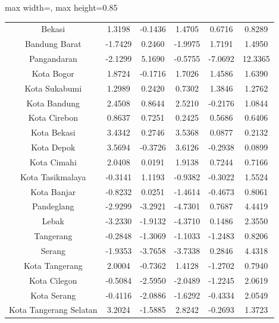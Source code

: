 \begin{table}[H]
\begin{adjustbox}{max width=\textwidth, max height=0.85\textheight}
\begin{tabular}{|c|c|c|c|c|c|}
Bekasi & 1.3198 & -0.1436 & 1.4705 & 0.6716 & 0.8289 \\
Bandung Barat & -1.7429 & 0.2460 & -1.9975 & 1.7191 & 1.4950 \\
Pangandaran & -2.1299 & 5.1690 & -0.5755 & -7.0692 & 12.3365 \\
Kota Bogor & 1.8724 & -0.1716 & 1.7026 & 1.4586 & 1.6390 \\
Kota Sukabumi & 1.2989 & 0.2420 & 0.7302 & 1.3846 & 1.2762 \\
Kota Bandung & 2.4508 & 0.8644 & 2.5210 & -0.2176 & 1.0844 \\
Kota Cirebon & 0.8637 & 0.7251 & 0.2425 & 0.5686 & 0.6406 \\
Kota Bekasi & 3.4342 & 0.2746 & 3.5368 & 0.0877 & 0.2132 \\
Kota Depok & 3.5694 & -0.3726 & 3.6126 & -0.2938 & 0.0899 \\
Kota Cimahi & 2.0408 & 0.0191 & 1.9138 & 0.7244 & 0.7166 \\
Kota Tasikmalaya & -0.3141 & 1.1193 & -0.9382 & -0.3022 & 1.5524 \\
Kota Banjar & -0.8232 & 0.0251 & -1.4614 & -0.4673 & 0.8061 \\
Pandeglang & -2.9299 & -3.2921 & -4.7301 & 0.7687 & 4.4419 \\
Lebak & -3.2330 & -1.9132 & -4.3710 & 0.1486 & 2.3550 \\
Tangerang & -0.2848 & -1.3069 & -1.1033 & -1.2483 & 0.8206 \\
Serang & -1.9353 & -3.7658 & -3.7338 & 0.2846 & 4.4318 \\
Kota Tangerang & 2.0004 & -0.7362 & 1.4128 & -1.2702 & 0.7940 \\
Kota Cilegon & -0.5084 & -2.5950 & -2.0489 & -1.2245 & 2.0619 \\
Kota Serang & -0.4116 & -2.0886 & -1.6292 & -0.4334 & 2.0549 \\
Kota Tangerang Selatan & 3.2024 & -1.5885 & 2.8242 & -0.2693 & 1.3723 \\
\hline
\end{tabular}
\end{adjustbox}
\end{table}